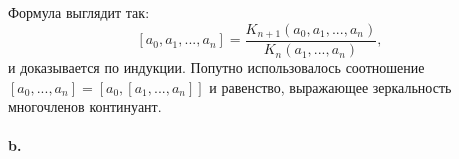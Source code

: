 \documentclass{mai_book}
\begin{document}
\noindent Формула выглядит так:
$$[a_0,a_1,...,a_n]=\frac{K_{n+1}(a_0,a_1,...,a_n)}{K_n(a_1,...,a_n)},$$
и доказывается по индукции. Попутно использовалось соотношение\linebreak
$[a_0,...,a_n]=[a_0,[a_1,...,a_n]]$ и равенство, выражающее зеркальность\linebreak
многочленов континуант.\\
\\
\hspace*{15pt}\textbf{b.}
\end{document}

